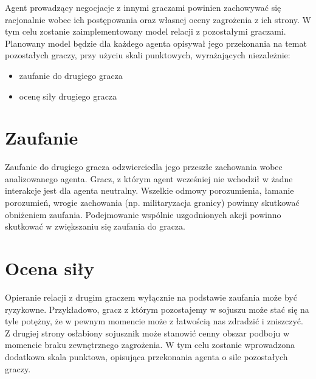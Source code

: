 Agent prowadzący negocjacje z innymi graczami powinien zachowywać się racjonalnie wobec ich postępowania oraz własnej oceny zagrożenia z ich strony. W tym celu zostanie zaimplementowany model relacji z pozostałymi graczami. Planowany model będzie dla każdego agenta opisywał jego przekonania na temat pozostałych graczy, przy użyciu skali punktowych, wyrażających niezależnie:
\begin{itemize}
	\item{zaufanie do drugiego gracza}
	\item{ocenę siły drugiego gracza}
\end{itemize}

\section{Zaufanie}
Zaufanie do drugiego gracza odzwierciedla jego przeszłe zachowania wobec analizowanego agenta. Gracz, z którym agent wcześniej nie wchodził w żadne interakcje jest dla agenta neutralny. Wszelkie odmowy porozumienia, łamanie porozumień, wrogie zachowania (np. militaryzacja granicy) powinny skutkować obniżeniem zaufania. Podejmowanie wspólnie uzgodnionych akcji powinno skutkować w zwiększaniu się zaufania do gracza.

\section{Ocena siły}
Opieranie relacji z drugim graczem wyłącznie na podstawie zaufania może być ryzykowne. Przykładowo, gracz z którym pozostajemy w sojuszu może stać się na tyle potężny, że w pewnym momencie może z łatwością nas zdradzić i zniszczyć. Z drugiej strony osłabiony sojusznik może stanowić cenny obszar podboju w momencie braku zewnętrznego zagrożenia. W tym celu zostanie wprowadzona dodatkowa skala punktowa, opisująca przekonania agenta o sile pozostałych graczy.
